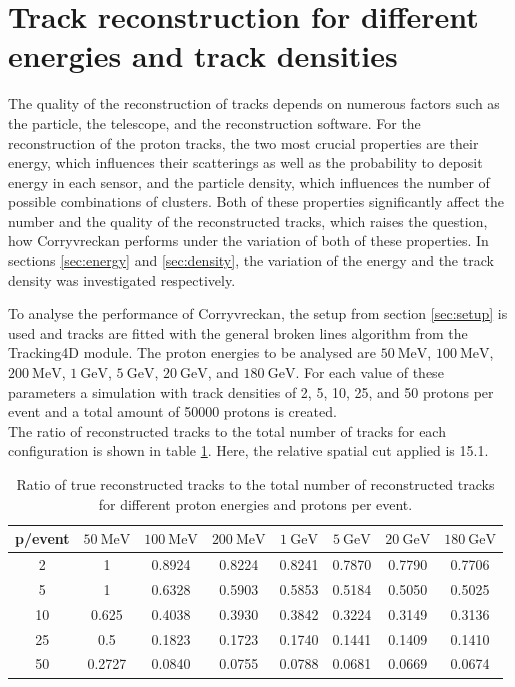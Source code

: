 \section{Track reconstruction for different energies and track densities}
The quality of the reconstruction of tracks depends on numerous factors such as the particle, the telescope, and the reconstruction software.
For the reconstruction of the proton tracks, the two most crucial properties are their energy, which influences their scatterings as well as the probability to deposit
energy in each sensor, and the particle density, which influences the number of possible combinations of clusters.
Both of these properties significantly affect the number and the quality of the reconstructed tracks, which raises the question, how Corryvreckan performs
under the variation of both of these properties.
In sections \ref{sec:energy} and \ref{sec:density}, the variation of the energy and the track density was investigated respectively.

To analyse the performance of Corryvreckan, the setup from section \ref{sec:setup} is used and tracks are fitted with the general broken lines algorithm
from the Tracking4D module.
The proton energies to be analysed are $\SI{50}{\mega\eV}$, $\SI{100}{\mega\eV}$, $\SI{200}{\mega\eV}$,
$\SI{1}{\giga\eV}$, $\SI{5}{\giga\eV}$, $\SI{20}{\giga\eV}$, and $\SI{180}{\giga\eV}$. For each value of these parameters a simulation with track densities
of 2, 5, 10, 25, and 50 protons per event and a total amount of 50000 protons is created. \\
The ratio of reconstructed tracks to the total number of tracks for each configuration is shown in table \ref{tab:study}. Here, the relative spatial cut applied is 15.1.


\begin{table}
  \centering
  \begin{tabular}{c | c c c c c c c}
    \toprule
     p/event &  $\SI{50}{\mega\eV}$ & $\SI{100}{\mega\eV}$ & $\SI{200}{\mega\eV}$ & $\SI{1}{\giga\eV}$ & $\SI{5}{\giga\eV}$ & $\SI{20}{\giga\eV}$ & $\SI{180}{\giga\eV}$ \\
    \midrule
     2   & 1 & 0.8924 & 0.8224 & 0.8241 & 0.7870 & 0.7790 & 0.7706  \\
     5   & 1 & 0.6328 & 0.5903 & 0.5853 & 0.5184 & 0.5050 & 0.5025  \\
     10  & 0.625 & 0.4038 & 0.3930 & 0.3842 & 0.3224 & 0.3149 & 0.3136  \\
     25  & 0.5 & 0.1823 & 0.1723 & 0.1740 & 0.1441 & 0.1409 & 0.1410  \\
     50  & 0.2727 & 0.0840 & 0.0755 & 0.0788 & 0.0681 & 0.0669 & 0.0674  \\
  \end{tabular}
  \caption{Ratio of true reconstructed tracks to the total number of reconstructed tracks for different proton energies and protons per event.}
  \label{tab:study}
\end{table}


